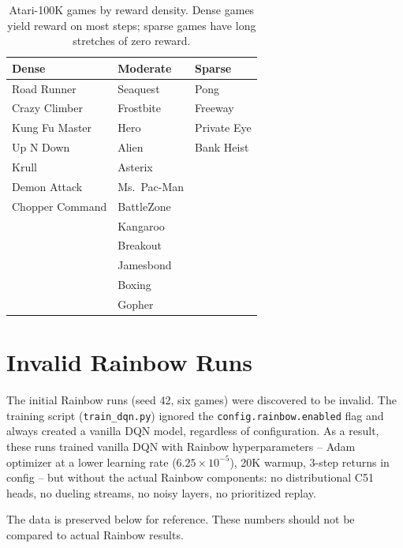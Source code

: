 \documentclass[11pt]{article}
\begin{document}
\vspace{0.3em}
\begin{table}[H]
\centering
\renewcommand{\arraystretch}{1.4}
\setlength{\tabcolsep}{14pt}
\begin{tabular}{l l l}
\toprule
\textbf{Dense} & \textbf{Moderate} & \textbf{Sparse} \\
\midrule
Road Runner     & Seaquest    & Pong        \\
Crazy Climber   & Frostbite   & Freeway     \\
Kung Fu Master  & Hero        & Private Eye \\
Up N Down       & Alien       & Bank Heist  \\
Krull           & Asterix     &             \\
Demon Attack    & Ms.\ Pac-Man &            \\
Chopper Command & BattleZone  &             \\
                & Kangaroo    &             \\
                & Breakout    &             \\
                & Jamesbond   &             \\
                & Boxing      &             \\
                & Gopher      &             \\
\bottomrule
\end{tabular}
\caption{Atari-100K games by reward density. Dense games yield reward
on most steps; sparse games have long stretches of zero reward.}
\end{table}

\section{Invalid Rainbow Runs}
\label{app:invalid-rainbow}

The initial Rainbow runs (seed 42, six games) were discovered to be
invalid. The training script (\texttt{train\_dqn.py}) ignored the
\texttt{config.rainbow.enabled} flag and always created a vanilla DQN
model, regardless of configuration. As a result, these runs trained
vanilla DQN with Rainbow hyperparameters -- Adam optimizer at a lower
learning rate ($6.25 \times 10^{-5}$), 20K warmup, 3-step returns in
config -- but without the actual Rainbow components: no distributional
C51 heads, no dueling streams, no noisy layers, no prioritized replay.

\medskip
\noindent The data is preserved below for reference. These numbers
should not be compared to actual Rainbow results.
\end{document}
